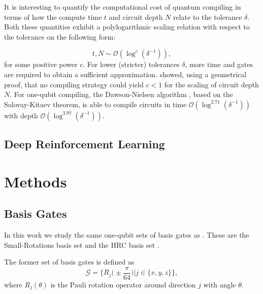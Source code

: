 \documentclass[%
 aip,
 floatfix,
 amsmath,amssymb,
 reprint,%
]{revtex4-1}
\begin{document}
It is interesting to quantify the computational cost of quantum compiling in terms of how the compute time $t$ and circuit depth $N$ relate to the tolerance $\delta$. Both these quantities exhibit a polylogarithmic scaling relation with respect to the tolerance on the following form:


\begin{equation}\label{eq:scaling_relation}
    t,N \sim \mathcal{O}(\log^c(\delta^{-1})),
\end{equation}
for some positive power $c$. For lower  (stricter) tolerances $\delta$, more time and gates are required to obtain a sufficient approximation. \citet{HRC} showed, using a geometrical proof, that no compiling strategy could yield $c < 1$ for the scaling of circuit depth $N$. For one-qubit compiling, the Dawson-Nielsen algorithm \cite{dawson2005solovaykitaev}, based on the Solovay-Kitaev theorem, is able to compile circuits in time $\mathcal{O}(\log^{2.71}(\delta^{-1}))$ with depth $\mathcal{O}(\log^{3.97}(\delta^{-1}))$.


\subsection{Deep Reinforcement Learning}



\section{Methods\label{sec:3}}

\subsection{Basis Gates}
In this work we study the same one-qubit sets of basis gates as \citet{QCRL}. These are the Small-Rotations basis set \cite{QCRL} and the HRC basis set \cite{HRC}.

The former set of basis gates is defined as
\begin{equation}\label{eq:smallrotations1}
    \mathcal{G} = \bigg\{R_j\bigg (\pm\frac{\pi}{64}\bigg)|j\in\{x,y,z\}\bigg\},
\end{equation}
where $R_j(\theta)$ is the Pauli rotation operator around direction $j$ with angle $\theta$. 
\end{document}
